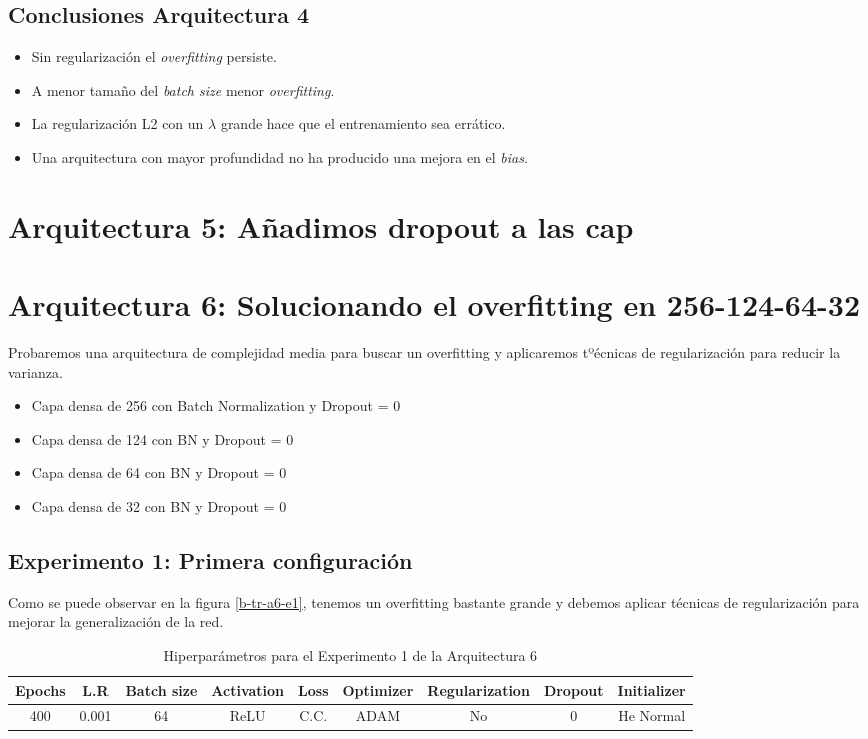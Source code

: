 \documentclass{article}
\begin{document}
        \subsection{Conclusiones Arquitectura 4}
        \label{d-cl-a4}
            \begin{itemize}
                \item Sin regularizaci\'on el \textit{overfitting} persiste.
                \item A menor tama\~no del \textit{batch size} menor \textit{overfitting}.
                \item La regularizaci\'on L2 con un $\lambda$ grande hace que el entrenamiento sea err\'atico.
                \item Una arquitectura con mayor profundidad no ha producido una mejora en el \textit{bias}.
            \end{itemize}
            

    \section{Arquitectura 5: A\~nadimos dropout a las cap}
	\label{d-s-a5}    
    
    \section{Arquitectura 6: Solucionando el overfitting en 256-124-64-32}
    \label{b-s-a6}
			Probaremos una arquitectura de complejidad media para buscar un overfitting y aplicaremos tº\'ecnicas de regularizaci\'on para reducir la varianza. 
			\begin{itemize}
			    \item Capa densa de 256 con Batch Normalization y Dropout = 0
                \item Capa densa de 124 con BN y Dropout = 0
                \item Capa densa de 64 con BN y Dropout = 0
                \item Capa densa de 32 con BN y Dropout = 0
			\end{itemize}
		\subsection{Experimento 1: Primera configuraci\'on}
        \label{b-s-a6-e1}
            Como se puede observar en la figura \ref{b-tr-a6-e1}, tenemos un overfitting bastante grande y debemos aplicar t\'ecnicas de regularizaci\'on para mejorar la generalizaci\'on de la red. 
            \begin{table}[!h]
				\begin{tabular}{|c|c|c|c|c|c|c|c|c|}
					\textbf{Epochs}&\textbf{L.R}&\textbf{Batch size}&\textbf{Activation}&\textbf{Loss}&\textbf{Optimizer}&\textbf{Regularization}&\textbf{Dropout}  & \textbf{Initializer} \\ \hline
					400 & 0.001 & 64 & ReLU & C.C. & ADAM & No & 0 & He Normal
				\end{tabular}
				\caption{Hiperpar\'ametros para el Experimento 1 de la Arquitectura 6}
				\label{tab:hip-b-a6-e1}
			\end{table}
   
\end{document}
